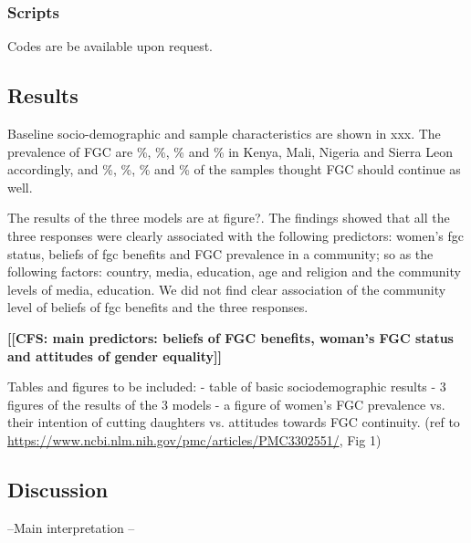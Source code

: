 \documentclass[12pt,]{article}
\newcommand{\comment}[1]{\textbf{[[#1]]}}
\newcommand{\cfcmt}[1]{\comment{CFS: #1}}
\begin{document}
\subsubsection{Scripts}\label{scripts}

Codes are be available upon request. 


\subsection{Results}\label{results-1}

Baseline socio-demographic and sample characteristics are shown in xxx.  The prevalence of FGC are \%, \%, \% and \% in Kenya, Mali, Nigeria and Sierra Leon accordingly, and \%, \%, \% and \%  of the samples thought FGC should continue as well.  

The results of the three models are at figure?.  The findings showed that all the three responses were clearly associated with the following predictors:  women’s fgc status, beliefs of fgc benefits and FGC prevalence in a community; so as the following factors:  country, media, education, age and religion and the community levels of media, education.  We did not find clear association of the community level of beliefs of fgc benefits and the three responses.


\cfcmt{main predictors:  beliefs of FGC benefits, woman's FGC status and attitudes of gender equality}

Tables and figures to be included:
- table of basic sociodemographic results
- 3 figures of the results of the 3 models
- a figure of women’s FGC prevalence vs. their intention of cutting daughters vs. attitudes towards FGC continuity.  (ref to \url{https://www.ncbi.nlm.nih.gov/pmc/articles/PMC3302551/}, Fig 1)



\subsection{Discussion}\label{Discussion}

--Main interpretation --
\end{document}
